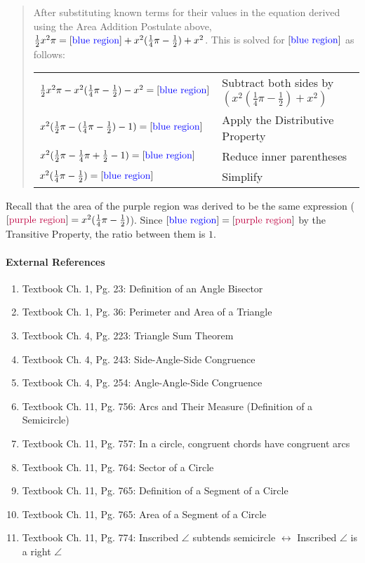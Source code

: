 \documentclass[letterpaper,12pt,twoside]{report}
\begin{document}
\begin{quotation}
		After substituting known terms for their values in the equation derived using the Area Addition Postulate above, $\frac{1}{2}x^2\pi=[\text{\color{blue} blue region}]+x^2(\frac{1}{4}\pi-\frac{1}{2})+x^2$. This is solved for $[\text{\color{blue} blue region}]$ as follows:
		
		\begin{center}
			\begin{tabular}{l | l}
				$\frac{1}{2}x^2\pi-x^2(\frac{1}{4}\pi-\frac{1}{2})-x^2=[\text{\color{blue} blue region}]$ & Subtract both sides by $(x^2(\frac{1}{4}\pi-\frac{1}{2})+x^2)$ \\
				$x^2(\frac{1}{2}\pi-(\frac{1}{4}\pi-\frac{1}{2})-1)=[\text{\color{blue} blue region}]$ & Apply the Distributive Property \\
				$x^2(\frac{1}{2}\pi-\frac{1}{4}\pi+\frac{1}{2}-1)=[\text{\color{blue} blue region}]$ & Reduce inner parentheses \\
				$x^2(\frac{1}{4}\pi-\frac{1}{2})=[\text{\color{blue} blue region}]$ & Simplify
			\end{tabular}
		\end{center}
	\end{quotation}
	
	Recall that the area of the {\color{purple} purple} region was derived to be the same expression ($[\text{\color{purple} purple region}]=x^2(\frac{1}{4}\pi-\frac{1}{2})$). Since $[\text{\color{blue} blue region}]=[\text{\color{purple} purple region}]$ by the Transitive Property, the ratio between them is $\boxed{1}$.
	
	\paragraph{External References}
	
	\begin{enumerate}
		\item Textbook Ch. 1, Pg. 23: Definition of an Angle Bisector
		\item Textbook Ch. 1, Pg. 36: Perimeter and Area of a Triangle
		\item Textbook Ch. 4, Pg. 223: Triangle Sum Theorem
		\item Textbook Ch. 4, Pg. 243: Side-Angle-Side Congruence
		\item Textbook Ch. 4, Pg. 254: Angle-Angle-Side Congruence
		\item Textbook Ch. 11, Pg. 756: Arcs and Their Measure (Definition of a Semicircle)
		\item Textbook Ch. 11, Pg. 757: In a circle, congruent chords have congruent arcs
		\item Textbook Ch. 11, Pg. 764: Sector of a Circle
		\item Textbook Ch. 11, Pg. 765: Definition of a Segment of a Circle
		\item Textbook Ch. 11, Pg. 765: Area of a Segment of a Circle
		\item Textbook Ch. 11, Pg. 774: Inscribed $\angle$ subtends semicircle  $\leftrightarrow$ Inscribed $\angle$ is a right $\angle$ 
	\end{enumerate}
	
\end{document}
